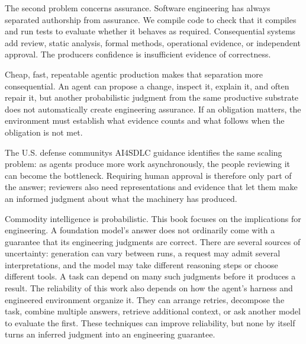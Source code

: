 

The second problem concerns assurance. Software engineering has always separated authorship from assurance. We compile code to check that it compiles and run tests to evaluate whether it behaves as required. Consequential systems add review, static analysis, formal methods, operational evidence, or independent approval. The producer\textquotesingle s confidence is insufficient evidence of correctness.


Cheap, fast, repeatable agentic production makes that separation more consequential. An agent can propose a change, inspect it, explain it, and often repair it, but another probabilistic judgment from the same productive substrate does not automatically create engineering assurance. If an obligation matters, the environment must establish what evidence counts and what follows when the obligation is not met.

The U.S. defense community\textquotesingle s AI4SDLC guidance identifies the same scaling problem: as agents produce more work asynchronously, the people reviewing it can become the bottleneck\citep{codeMilWorkflowGovernance2026}. Requiring human approval is therefore only part of the answer; reviewers also need representations and evidence that let them make an informed judgment about what the machinery has produced.

Commodity intelligence is probabilistic. This book focuses on the implications for engineering. A foundation model's answer does not ordinarily come with a guarantee that its engineering judgments are correct. There are several sources of uncertainty: generation can vary between runs, a request may admit several interpretations, and the model may take different reasoning steps or choose different tools. A task can depend on many such judgments before it produces a result. The reliability of this work also depends on how the agent's harness and engineered environment organize it. They can arrange retries, decompose the task, combine multiple answers, retrieve additional context, or ask another model to evaluate the first. These techniques can improve reliability, but none by itself turns an inferred judgment into an engineering guarantee.

